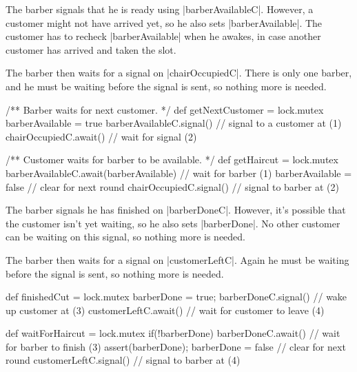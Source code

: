 
\begin{slide}

The barber signals that he is ready using |barberAvailableC|.  However, a
customer might not have arrived yet, so he also sets |barberAvailable|.  The
customer has to recheck |barberAvailable| when he awakes, in case another
customer has arrived and taken the slot. 

The barber then waits for a signal on |chairOccupiedC|.  There is only one
barber, and he must be waiting before the signal is sent, so nothing more is
needed. 
\end{slide}


\begin{slide}

\begin{scala}
  /** Barber waits for next customer. */
  def getNextCustomer = lock.mutex{
    barberAvailable = true
    barberAvailableC.signal()                  // signal to a customer at (1)
    chairOccupiedC.await()                     // wait for signal (2)
  }

  /** Customer waits for barber to be available. */ 
  def getHaircut = lock.mutex{
    barberAvailableC.await(barberAvailable) // wait for barber (1)
    barberAvailable = false                   // clear for next round
    chairOccupiedC.signal()                   // signal to barber at (2)
  }
\end{scala}
\end{slide}


\begin{slide}

The barber signals he has finished on |barberDoneC|.  However, it's possible that
the customer isn't yet waiting, so he also sets |barberDone|.  No other
customer can be waiting on this signal, so nothing more is needed.

The barber then waits for a signal on |customerLeftC|.  Again he must be
waiting before the signal is sent, so nothing more is needed.
\begin{scala}
  def finishedCut = lock.mutex{
    barberDone = true; barberDoneC.signal()  // wake up customer at (3)
    customerLeftC.await()                        // wait for customer to leave (4)
  }

  def waitForHaircut = lock.mutex{
    if(!barberDone) barberDoneC.await()     // wait for barber to finish (3)
    assert(barberDone); barberDone = false  // clear for next round
    customerLeftC.signal()                     // signal to barber at (4)
  }
\end{scala}
\end{slide}




